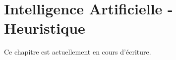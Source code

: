 \chapter{Intelligence Artificielle - Heuristique}

\begin{info}
	Ce chapitre est actuellement en cours d'écriture.
\end{info}

%	
% 
%	
%	
%		
%	
%	
%	
%		
%		
